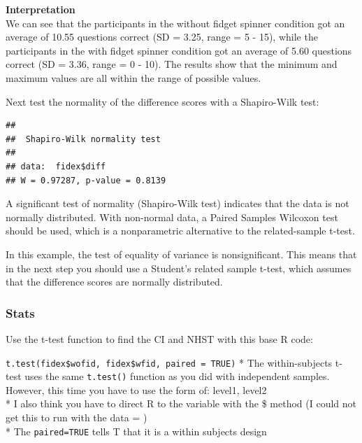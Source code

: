 \documentclass[
]{book}
\newenvironment{Shaded}{\begin{snugshade}}{\end{snugshade}}
\newcommand{\KeywordTok}[1]{\textcolor[rgb]{0.13,0.29,0.53}{\textbf{#1}}}
\newcommand{\NormalTok}[1]{#1}
\newcommand{\OperatorTok}[1]{\textcolor[rgb]{0.81,0.36,0.00}{\textbf{#1}}}
\begin{document}
\textbf{Interpretation}\\
We can see that the participants in the without fidget spinner condition got an average of 10.55 questions correct (SD = 3.25, range = 5 - 15), while the participants in the with fidget spinner condition got an average of 5.60 questions correct (SD = 3.36, range = 0 - 10). The results show that the minimum and maximum values are all within the range of possible values.

Next test the normality of the difference scores with a Shapiro-Wilk test:

\begin{Shaded}
\end{Shaded}

\begin{verbatim}
## 
##  Shapiro-Wilk normality test
## 
## data:  fidex$diff
## W = 0.97287, p-value = 0.8139
\end{verbatim}

A significant test of normality (Shapiro-Wilk test) indicates that the data is not normally distributed. With non-normal data, a Paired Samples Wilcoxon test should be used, which is a nonparametric alternative to the related-sample t-test.

In this example, the test of equality of variance is nonsignificant. This means that in the next step you should use a Student's related sample t-test, which assumes that the difference scores are normally distributed.

\hypertarget{stats-1}{%
\subsubsection{Stats}\label{stats-1}}

Use the t-test function to find the CI and NHST with this base R code:

\texttt{t.test(fidex\$wofid,\ fidex\$wfid,\ paired\ =\ TRUE)}
* The within-subjects t-test uses the same \texttt{t.test()} function as you did with independent samples. However, this time you have to use the form of: level1, level2\\
* I also think you have to direct R to the variable with the \$ method (I could not get this to run with the data = )\\
* The \texttt{paired=TRUE} tells T that it is a within subjects design
\end{document}
